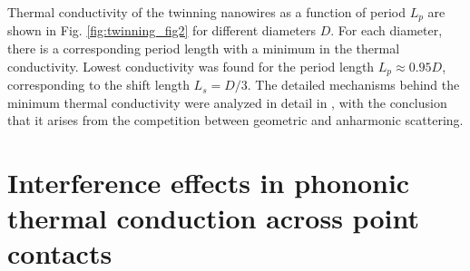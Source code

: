 Thermal conductivity of the twinning nanowires as a function of period $L_p$ are shown in Fig. \ref{fig:twinning_fig2} for different diameters $D$. For each diameter, there is a corresponding period length with a minimum in the thermal conductivity. Lowest conductivity was found for the period length $L_p\approx 0.95D$, corresponding to the shift length $L_s=D/3$. The detailed mechanisms behind the minimum thermal conductivity were analyzed in detail in , with the conclusion that it arises from the competition between geometric and anharmonic scattering.  %

   





\section{Interference effects in phononic thermal conduction across point contacts}
\label{sec:results_interference}

